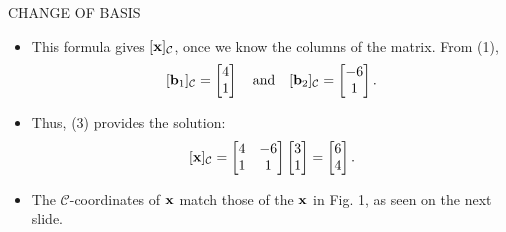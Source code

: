 \begin{frame}[shrink=8]{CHANGE OF BASIS}
\begin{itemize}
\item This formula gives $[\mathbf{x}]_{\mathcal C}$, once we know the columns of the matrix. From (1),
\[
[\mathbf{b}_1]_{\mathcal C}=\begin{bmatrix}4\\1\end{bmatrix}
\quad\text{and}\quad
[\mathbf{b}_2]_{\mathcal C}=\begin{bmatrix}-6\\1\end{bmatrix}.
\]
\item Thus, (3) provides the solution:
\[
[\mathbf{x}]_{\mathcal C}=
\begin{bmatrix}4&-6\\1&1\end{bmatrix}
\begin{bmatrix}3\\1\end{bmatrix}
=\begin{bmatrix}6\\4\end{bmatrix}.
\]
\item The $\mathcal C$-coordinates of $\mathbf{x}$ match those of the $\mathbf{x}$ in Fig. 1, as seen on the next slide.
\end{itemize}
\end{frame}

